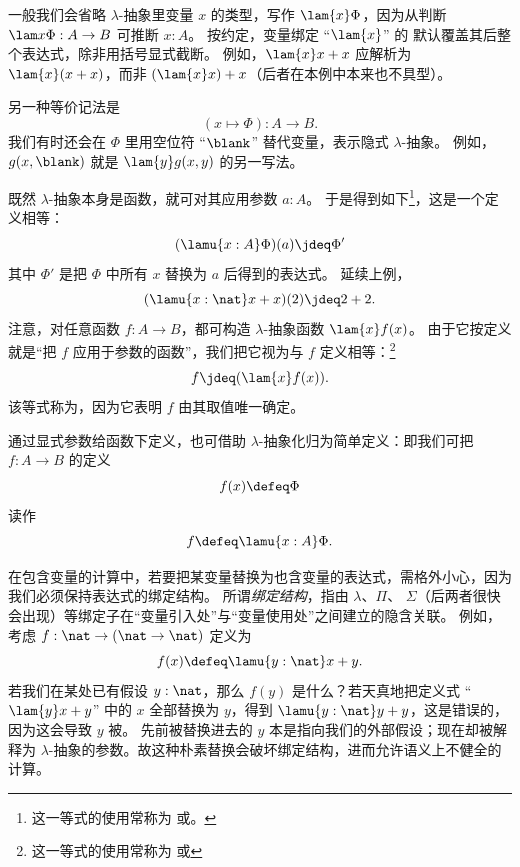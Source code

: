 一般我们会省略 $\lambda$-抽象里变量 $x$ 的类型，写作 $\lam{x}\Phi$，因为从判断 $\lam x \Phi : A\to B$ 可推断 $x:A$。
按约定，变量绑定 ``$\lam{x}$'' 的
%
%
默认覆盖其后整个表达式，除非用括号显式截断。
例如，$\lam{x} x+x$ 应解析为 $\lam{x} (x+x)$，而非 $(\lam{x}x)+x$（后者在本例中本来也不具型）。

另一种等价记法是
%
\[ (x \mapsto \Phi) : A \to B. \]
%
我们有时还会在 $\Phi$ 里用空位符 ``$\blank$'' 替代变量，表示隐式 $\lambda$-抽象。
例如，$g(x,\blank)$ 就是 $\lam{y} g(x,y)$ 的另一写法。

既然 $\lambda$-抽象本身是函数，就可对其应用参数 $a:A$。
于是得到如下\footnote{这一等式的使用常称为
%
%
或。%
%
%
}，这是一个定义相等：
\[(\lamu{x:A}\Phi)(a) \jdeq \Phi'\]
其中 $\Phi'$ 是把
$\Phi$ 中所有 $x$ 替换为 $a$ 后得到的表达式。
延续上例，
%
\[ (\lamu{x:\nat}x+x)(2) \jdeq 2+2. \]
%
注意，对任意函数 $f:A\to B$，都可构造 $\lambda$-抽象函数 $\lam{x} f(x)$。
由于它按定义就是“把 $f$ 应用于参数的函数”，我们把它视为与 $f$ 定义相等：\footnote{这一等式的使用常称为
%
%
或}
\[ f \jdeq (\lam{x} f(x)). \]
该等式称为，因为它表明 $f$ 由其取值唯一确定。

通过显式参数给函数下定义，也可借助 $\lambda$-抽象化归为简单定义：即我们可把
$f: A\to B$ 的定义
\[ f(x) \defeq \Phi \]
读作
\[ f \defeq \lamu{x:A}\Phi.\]

在包含变量的计算中，若要把某变量替换为也含变量的表达式，需格外小心，因为我们必须保持表达式的绑定结构。
所谓\emph{绑定结构}，指由 $\lambda$、$\Pi$、
$\Sigma$（后两者很快会出现）等绑定子在“变量引入处”与“变量使用处”之间建立的隐含关联。
例如，考虑 $f : \nat \to (\nat \to \nat)$
定义为
\[ f(x) \defeq \lamu{y:\nat} x + y. \]
若我们在某处已有假设 $y : \nat$，那么 $f(y)$ 是什么？若天真地把定义式 ``$\lam{y}x+y$'' 中的 $x$ 全部替换为 $y$，得到 $\lamu{y:\nat} y + y$，这是错误的，因为这会导致 $y$ 被。
%
%
先前被替换进去的 $y$ 本是指向我们的外部假设；现在却被解释为 $\lambda$-抽象的参数。故这种朴素替换会破坏绑定结构，进而允许语义上不健全的计算。

